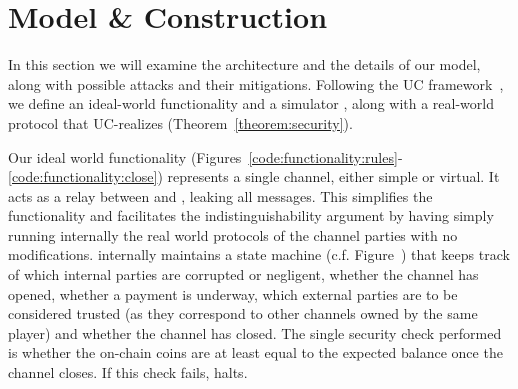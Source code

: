 \section{Model \& Construction}
  In this section we will examine the architecture and the details of our model,
  along with possible attacks and their mitigations. Following the UC
  framework~\cite{uc}, we define an ideal-world functionality \fchan and a
  simulator \simulator, along with a real-world protocol \pchan that UC-realizes
  \fchan (Theorem~\ref{theorem:security}).

  Our ideal world functionality \fchan
  (Figures~\ref{code:functionality:rules}-\ref{code:functionality:close})
  represents a single channel, either simple or virtual. It acts as a relay
  between \adversary and \environment, leaking all messages. This simplifies the
  functionality and facilitates the indistinguishability argument by having
  \simulator simply running internally the real world protocols of the channel
  parties \pchan with no modifications. \fchan internally maintains a state
  machine (c.f. Figure~) that keeps track of which internal
  parties are corrupted or negligent, whether the channel has opened, whether a
  payment is underway, which external parties are to be considered trusted (as
  they correspond to other channels owned by the same player) and whether the
  channel has closed. The single security check performed is whether the
  on-chain coins are at least equal to the expected balance once the channel
  closes. If this check fails, \fchan halts.
